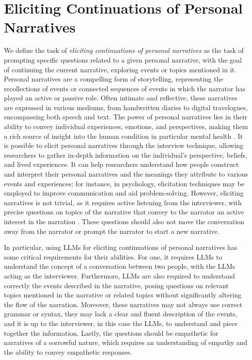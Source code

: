 \section{Eliciting Continuations of Personal Narratives}
We define the task of \emph{eliciting continuations of personal narratives} as the task of prompting specific questions related to a given personal narrative, with the goal of continuing the current narrative, exploring events or topics mentioned in it. Personal narratives are a compelling form of storytelling, representing the recollections of events or connected sequences of events in which the narrator has played an active or passive role. Often intimate and reflective, these narratives are expressed in various mediums, from handwritten diaries to digital travelogues, encompassing both speech and text. The power of personal narratives lies in their ability to convey individual experiences, emotions, and perspectives, making them a rich source of insight into the human condition \cite{noauthor-undated-sy, doi:10.1080/1361332032000044567, Bailey2002-fw} in particular mental health \cite{coadapt}. %
It is possible to elicit personal narratives through the interview technique, allowing researchers to gather in-depth information on the individual's perspective, beliefs, and lived experiences. It can help researchers understand how people construct and interpret their personal narratives and the meanings they attribute to various events and experiences; for instance, in psychology, elicitation techniques may be employed to improve communication and aid problem-solving. However, eliciting narratives is not trivial, as it requires active listening from the interviewer, with precise questions on topics of the narrative that convey to the narrator an active interest in the narration \cite{Anderson2016-jq}. These questions should also not move the conversation away from the narrator or prompt the narrator to start a new narrative.

In particular, using LLMs for eliciting continuations of personal narratives has some critical requirements for their abilities. For one, it requires LLMs to understand the concept of a conversation between two people, with the LLMs acting as the interviewer. Furthermore, LLMs are also required to understand correctly the events described in the narrative, posing questions on relevant topics mentioned in the narrative or related topics without significantly altering the flow of the narration. Moreover, these narratives may not always use correct grammar or syntax, they may lack a clear and fluent description of the events, and it is up to the interviewer, in this case the LLMs, to understand and piece together the information. Lastly, the questions should be empathetic for narratives of a sorrowful nature, which requires an understanding of empathy and the ability to convey empathetic responses.

